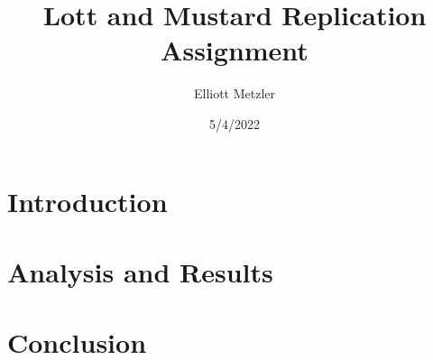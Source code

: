 \documentclass{article}
\author{Elliott Metzler}
\title{Lott and Mustard Replication Assignment}
\date{5/4/2022}
\begin{document}
\maketitle

\section{Introduction}

\section{Analysis and Results}








\section{Conclusion}
\end{document}
